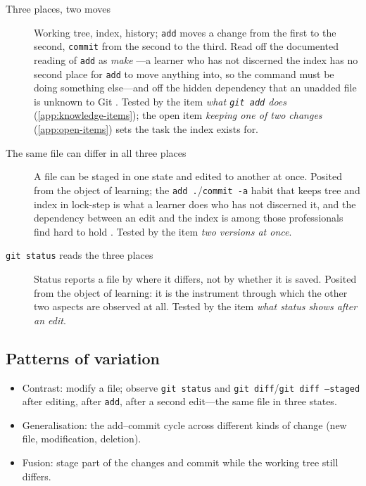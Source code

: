 \begin{description}
  \item[Three places, two moves]
    Working tree, index, history; \texttt{add} moves a change from the
    first to the second, \texttt{commit} from the second to the third.
    Read off the documented reading of \texttt{add} as \emph{make}
    \autocite[Sec.~5.3]{IsomottonenCochez2014}---a learner who has not
    discerned the index has no second place for \texttt{add} to move
    anything into, so the command must be doing something else---and
    off the hidden dependency that an unadded file is unknown to Git
    \autocite{Church2014HiddenDependencies}.
    Tested by the item \emph{what \texttt{git add} does}
    (\cref{app:knowledge-items}); the open item \emph{keeping one of two
    changes} (\cref{app:open-items}) sets the task the index exists for.
  \item[The same file can differ in all three places]
    A file can be staged in one state and edited to another at once.
    Posited from the object of learning; the \texttt{add .}/\texttt{commit
    -a} habit that keeps tree and index in lock-step
    \autocite{IsomottonenCochez2014} is what a learner does who has not
    discerned it, and the dependency between an edit and the index is
    among those professionals find hard to hold
    \autocite{Church2014HiddenDependencies}.
    Tested by the item \emph{two versions at once}.
  \item[\texttt{git status} reads the three places]
    Status reports a file by where it differs, not by whether it is
    saved.
    Posited from the object of learning: it is the instrument through
    which the other two aspects are observed at all.
    Tested by the item \emph{what status shows after an edit}.
\end{description}

\subsection{Patterns of variation}

\begin{itemize}
  \item Contrast: modify a file; observe \texttt{git status} and
    \texttt{git diff}/\texttt{git diff --staged} after editing, after
    \texttt{add}, after a second edit---the same file in three states.
  \item Generalisation: the add--commit cycle across different kinds of
    change (new file, modification, deletion).
  \item Fusion: stage part of the changes and commit while the working
    tree still differs.
\end{itemize}
